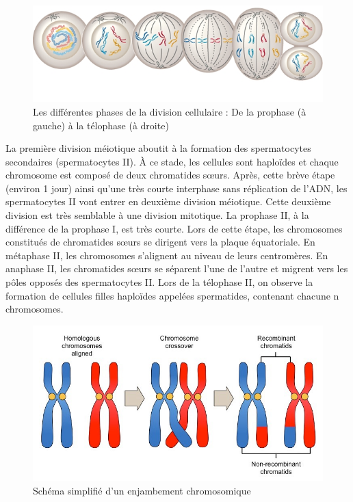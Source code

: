\documentclass[12pt,twoside]{reedthesis}
\theoremstyle{definition}
\theoremstyle{definition}
\theoremstyle{remark}
\begin{document}
  \begin{figure}
  
  {\centering \includegraphics[scale=.55]{figure/phases_mitose} 
  
  }
  
  \caption[Les différentes phases de la division cellulaire]{Les différentes phases de la division cellulaire : De la prophase (à gauche) à la télophase (à droite)}\label{fig:mitose}
  \end{figure}
  
  La première division méiotique aboutit à la formation des spermatocytes
  secondaires (spermatocytes II). À ce stade, les cellules sont haploïdes
  et chaque chromosome est composé de deux chromatides sœurs. Après, cette
  brève étape (environ 1 jour) ainsi qu'une très courte interphase sans
  réplication de l'ADN, les spermatocytes II vont entrer en deuxième
  division méiotique. Cette deuxième division est très semblable à une
  division mitotique. La prophase II, à la différence de la prophase I,
  est très courte. Lors de cette étape, les chromosomes constitués de
  chromatides sœurs se dirigent vers la plaque équatoriale. En métaphase
  II, les chromosomes s'alignent au niveau de leurs centromères. En
  anaphase II, les chromatides sœurs se séparent l'une de l'autre et
  migrent vers les pôles opposés des spermatocytes II. Lors de la
  télophase II, on observe la formation de cellules filles haploïdes
  appelées spermatides, contenant chacune n chromosomes.
  
  \begin{figure}
  
  {\centering \includegraphics[scale=0.35]{figure/crossingover} 
  
  }
  
  \caption{Schéma simplifié d'un enjambement chromosomique}\label{fig:crossingover}
  \end{figure}
  
\end{document}
